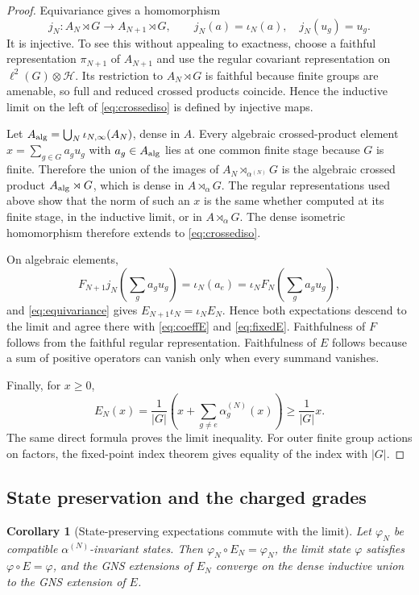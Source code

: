 \documentclass[11pt]{article}
\newtheorem{corollary}[theorem]{Corollary}
\theoremstyle{remark}
\newcommand{\Hh}{\mathcal H}
\begin{document}
\begin{proof}
Equivariance gives a homomorphism
\[
 j_N:A_N\rtimes G\longrightarrow A_{N+1}\rtimes G,\qquad
 j_N(a)=\iota_N(a),\quad j_N(u_g)=u_g.
\tag{6.6}\label{eq:crossmap}
\]
It is injective.  To see this without appealing to exactness, choose a
faithful representation $\pi_{N+1}$ of $A_{N+1}$ and use the regular
covariant representation on $\ell^2(G)\otimes\Hh$.  Its restriction to
$A_N\rtimes G$ is faithful because finite groups are amenable, so full
and reduced crossed products coincide.  Hence the inductive limit on the
left of \eqref{eq:crossediso} is defined by injective maps.

Let $A_{\rm alg}=\bigcup_N\iota_{N,\infty}(A_N)$, dense in $A$.
Every algebraic crossed-product element
$x=\sum_{g\in G}a_gu_g$ with $a_g\in A_{\rm alg}$ lies at one common
finite stage because $G$ is finite.  Therefore the union of the images
of $A_N\rtimes_{\alpha^{(N)}}G$ is the algebraic crossed product
$A_{\rm alg}\rtimes G$, which is dense in $A\rtimes_\alpha G$.
The regular representations used above show that the norm of such an
$x$ is the same whether computed at its finite stage, in the inductive
limit, or in $A\rtimes_\alpha G$.  The dense isometric homomorphism
therefore extends to \eqref{eq:crossediso}.

On algebraic elements,
\[
 F_{N+1}j_N\!\left(\sum_ga_gu_g\right)
 =\iota_N(a_e)=\iota_NF_N\!\left(\sum_ga_gu_g\right),
\]
and \eqref{eq:equivariance} gives
$E_{N+1}\iota_N=\iota_NE_N$.  Hence both expectations descend to the
limit and agree there with \eqref{eq:coeffE} and
\eqref{eq:fixedE}.  Faithfulness of $F$ follows from the faithful regular
representation.  Faithfulness of $E$ follows because a sum of positive
operators can vanish only when every summand vanishes.

Finally, for $x\ge0$,
\[
 E_N(x)=\frac1{|G|}
 \left(x+\sum_{g\ne e}\alpha_g^{(N)}(x)\right)
 \ge\frac1{|G|}x.
\]
The same direct formula proves the limit inequality.  For outer finite
group actions on factors, the fixed-point index theorem gives equality
of the index with $|G|$.
\end{proof}

\subsection{State preservation and the charged grades}

\begin{corollary}[State-preserving expectations commute with the limit]
\label{cor:stateE}
Let $\varphi_N$ be compatible $\alpha^{(N)}$-invariant states.  Then
$\varphi_N\circ E_N=\varphi_N$, the limit state $\varphi$ satisfies
$\varphi\circ E=\varphi$, and the GNS extensions of $E_N$ converge on
the dense inductive union to the GNS extension of $E$.
\end{corollary}
\end{document}

